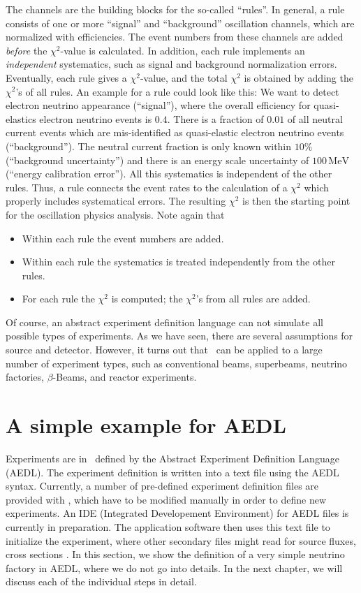 The channels are the building blocks for the so-called ``rules''. In general, a rule consists of one or more ``signal'' and ``background'' oscillation channels, which are normalized with efficiencies. The event numbers from these channels are added {\em before} the $\chi^2$-value is calculated. In addition, each rule implements an {\em independent} systematics, such as signal and background normalization errors. Eventually, each rule gives a $\chi^2$-value, and the total $\chi^2$ is obtained by adding the $\chi^2$'s of all rules. 
 An example for a rule could look like this: We want to detect electron neutrino appearance (``signal''), where the overall efficiency for quasi-elastics electron neutrino events is $0.4$. There is a fraction of $0.01$ of all neutral current events which are mis-identified as quasi-elastic electron neutrino events (``background''). The neutral current fraction is only known within $10\%$ (``background uncertainty'') and there is
an energy scale uncertainty of $100\,\mathrm{MeV}$ (``energy calibration error'').
All this systematics is independent of the other rules.  Thus, a rule connects the event rates to the calculation of a $\chi^2$ which properly includes 
systematical errors. The resulting $\chi^2$ is then the starting point for the
oscillation physics analysis. Note again that
\begin{itemize}
\item
 Within each rule the event numbers are added.
\item
 Within each rule the systematics is treated independently from the other rules.
\item
 For each rule the $\chi^2$ is computed; the $\chi^2$'s from all rules are added.
\end{itemize}

Of course, an abstract experiment definition language can not simulate all possible types of experiments. As we have seen, there are several assumptions for source and detector. However, it turns out that \GLOBES\ can be applied to a large number of experiment types, such as conventional beams, superbeams, neutrino factories, $\beta$-Beams, and reactor experiments.

\section{A simple example for AEDL}

Experiments are in \GLOBES\ defined by the Abstract Experiment Definition Language (AEDL). The experiment definition is written into a text file using the AEDL syntax. Currently, a number of pre-defined experiment definition files are provided with \GLOBES , which have to be modified manually in order to define new experiments. An IDE (Integrated Developement Environment) for AEDL files is currently in preparation. The application software then uses this text file to initialize the experiment, where other secondary files might read for source fluxes, cross sections \etc . In this section, we show the definition of a very simple neutrino factory in AEDL, where we do not go into details. In the next chapter, we will discuss each of the individual steps in detail.

